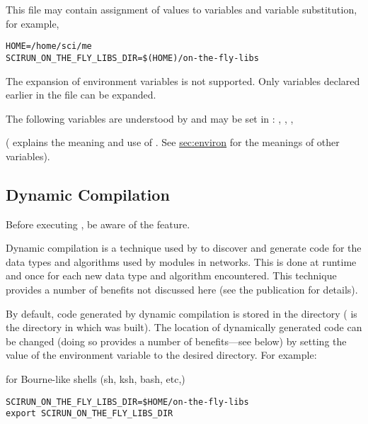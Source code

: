 This file may contain assignment of values to variables and variable
substitution, for example,

\begin{verbatim}
HOME=/home/sci/me
SCIRUN_ON_THE_FLY_LIBS_DIR=$(HOME)/on-the-fly-libs
\end{verbatim}

The expansion of environment variables is not supported.  Only
variables declared earlier in the file can be expanded.

The following variables are understood by \sr{} and may be set in
: ,
, ,

( explains the meaning and use
of .  See \hyperref{the
  previous section}{Section~}{}{sec:environ}
for the meanings of  other variables).

\subsection{Dynamic Compilation}
\label{sec:dyncomp}

Before executing \sr{},  be aware of the
 feature.

Dynamic compilation is a technique used by \sr{} to discover and
generate code for the data types and algorithms used by modules in
networks.  This is done at runtime and once for each new
data type and algorithm encountered.  This technique provides a number
of benefits not discussed here (see the publication 
for details).

By default, code generated by dynamic compilation is stored in the
directory  
( is the directory in which \sr{} was built).  The
location of dynamically generated code can be changed (doing so
provides a number of benefits---see below) by setting the value of the
environment variable  to the
desired directory. For example:

for Bourne-like shells (sh, ksh, bash, etc,)

\begin{verbatim}
SCIRUN_ON_THE_FLY_LIBS_DIR=$HOME/on-the-fly-libs
export SCIRUN_ON_THE_FLY_LIBS_DIR
\end{verbatim}

